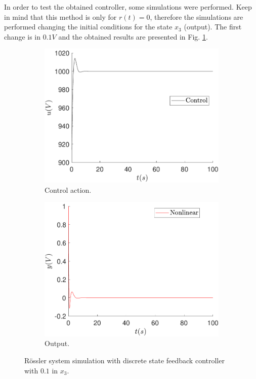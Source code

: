	
	In order to test the obtained controller, some simulations were performed. Keep in mind that this method is only for $r(t)=0$, therefore the simulations are performed changing the initial conditions for the state $x_3$ (output). The first change is in $0.1V$ and the obtained results are presented in Fig. \ref{fig:feedback_ref0_x30_1}.
	\begin{figure}
        \centering
        \begin{subfigure}[b]{0.475\textwidth}
            \centering
            \includegraphics[scale=0.425]{files/feedback/Ref0/control_sfc_x30_1_ref_0.pdf}
            \caption{Control action.}
        \end{subfigure}
        \vskip0.1cm
        \begin{subfigure}[b]{0.475\textwidth}   
            \centering 
            \includegraphics[scale=0.425]{files/feedback/Ref0/sfc_x30_1_ref_0.pdf}
            \caption{Output.}
        \end{subfigure}
        \caption{Rössler system simulation with discrete state feedback controller with $0.1$ in $x_3$.}
        \label{fig:feedback_ref0_x30_1}
	\end{figure}
	
